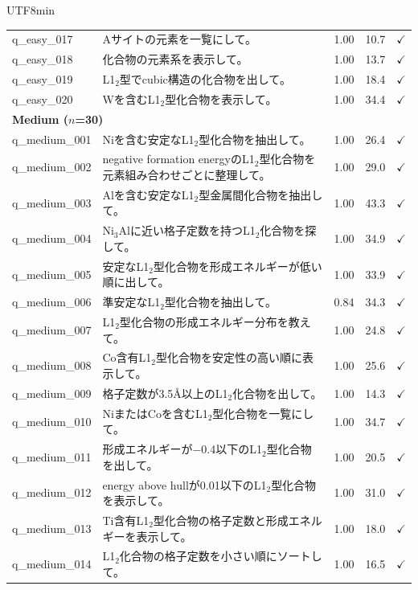 \documentclass[sn-mathphys,Numbered]{sn-jnl}
\begin{document}
\begin{CJK}{UTF8}{min}
\begin{longtable}{lp{8.5cm}ccl}
    q\_easy\_017 & Aサイトの元素を一覧にして。 & 1.00 & 10.7 & $\checkmark$ \\
    q\_easy\_018 & 化合物の元素系を表示して。 & 1.00 & 13.7 & $\checkmark$ \\
    q\_easy\_019 & L1$_2$型でcubic構造の化合物を出して。 & 1.00 & 18.4 & $\checkmark$ \\
    q\_easy\_020 & Wを含むL1$_2$型化合物を表示して。 & 1.00 & 34.4 & $\checkmark$ \\
    \midrule
    \multicolumn{5}{l}{\textbf{Medium ($n$=30)}} \\
    \midrule
    q\_medium\_001 & Niを含む安定なL1$_2$型化合物を抽出して。 & 1.00 & 26.4 & $\checkmark$ \\
    q\_medium\_002 & negative formation energyのL1$_2$型化合物を元素組み合わせごとに整理して。 & 1.00 & 29.0 & $\checkmark$ \\
    q\_medium\_003 & Alを含む安定なL1$_2$型金属間化合物を抽出して。 & 1.00 & 43.3 & $\checkmark$ \\
    q\_medium\_004 & Ni$_3$Alに近い格子定数を持つL1$_2$化合物を探して。 & 1.00 & 34.9 & $\checkmark$ \\
    q\_medium\_005 & 安定なL1$_2$型化合物を形成エネルギーが低い順に出して。 & 1.00 & 33.9 & $\checkmark$ \\
    q\_medium\_006 & 準安定なL1$_2$型化合物を抽出して。 & 0.84 & 34.3 & $\checkmark$ \\
    q\_medium\_007 & L1$_2$型化合物の形成エネルギー分布を教えて。 & 1.00 & 24.8 & $\checkmark$ \\
    q\_medium\_008 & Co含有L1$_2$型化合物を安定性の高い順に表示して。 & 1.00 & 25.6 & $\checkmark$ \\
    q\_medium\_009 & 格子定数が3.5\AA 以上のL1$_2$化合物を出して。 & 1.00 & 14.3 & $\checkmark$ \\
    q\_medium\_010 & NiまたはCoを含むL1$_2$型化合物を一覧にして。 & 1.00 & 34.7 & $\checkmark$ \\
    q\_medium\_011 & 形成エネルギーが$-$0.4以下のL1$_2$型化合物を出して。 & 1.00 & 20.5 & $\checkmark$ \\
    q\_medium\_012 & energy above hullが0.01以下のL1$_2$型化合物を表示して。 & 1.00 & 31.0 & $\checkmark$ \\
    q\_medium\_013 & Ti含有L1$_2$型化合物の格子定数と形成エネルギーを表示して。 & 1.00 & 18.0 & $\checkmark$ \\
    q\_medium\_014 & L1$_2$化合物の格子定数を小さい順にソートして。 & 1.00 & 16.5 & $\checkmark$ \\

\end{longtable}
\end{CJK}
\end{document}
